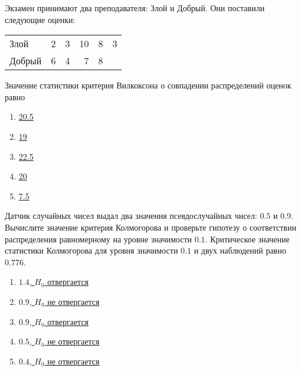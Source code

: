 \documentclass[t]{beamer}
\begin{document}
 \begin{frame} \label{28} 
\begin{block}{28} 

Экзамен принимают два преподавателя: Злой и Добрый. Они поставили следующие оценки:

\begin{center}
\begin{tabular}{lrrrrr} \toprule
Злой   & 2 & 3 & 10 & 8 & 3 \\
Добрый & 6 & 4 & 7  & 8 & \\
\bottomrule
\end{tabular}
\end{center}

Значение статистики критерия Вилкоксона о совпадении распределений оценок равно

  


 \end{block} 
\begin{enumerate} 
\item[] \hyperlink{28-No}{\beamergotobutton{} 20.5}
\item[] \hyperlink{28-No}{\beamergotobutton{} 19}
\item[] \hyperlink{28-Yes}{\beamergotobutton{} 22.5}
\item[] \hyperlink{28-No}{\beamergotobutton{} 20}
\item[] \hyperlink{28-No}{\beamergotobutton{} 7.5}
\end{enumerate} 
\end{frame} 


 \begin{frame} \label{29} 
\begin{block}{29} 

Датчик случайных чисел выдал два значения псевдослучайных чисел: $0.5$ и $0.9$. Вычислите значение критерия Колмогорова и проверьте гипотезу о соответствии распределения равномерному на уровне значимости $0.1$. Критическое значение статистики Колмогорова для уровня значимости $0.1$ и двух наблюдений равно $0.776$.
  


 \end{block} 
\begin{enumerate} 
\item[] \hyperlink{29-No}{\beamergotobutton{} $1.4$, $H_0$ отвергается}
\item[] \hyperlink{29-No}{\beamergotobutton{} $0.9$, $H_0$ не отвергается}
\item[] \hyperlink{29-No}{\beamergotobutton{} $0.9$, $H_0$ отвергается}
\item[] \hyperlink{29-Yes}{\beamergotobutton{} $0.5$, $H_0$ не отвергается}
\item[] \hyperlink{29-No}{\beamergotobutton{} $0.4$, $H_0$ не отвергается}
\end{enumerate} 
\end{frame} 
\end{document}
